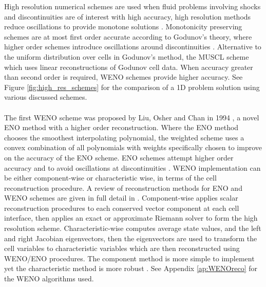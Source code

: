 	High resolution numerical schemes are used when fluid problems involving shocks and discontinuities are of interest with high accuracy, high resolution methods reduce oscillations to provide monotone solutions \cite{Chung02}. Monotonicity preserving schemes are at most first order accurate according to Godunov's theory, where higher order schemes introduce oscillations around discontinuities \cite{Cockburn01}. Alternative to the uniform distribution over cells in Godunov's method, the MUSCL scheme which uses linear reconstructions of Godunov cell data. When accuracy greater than second order is required, WENO schemes provide higher accuracy. See Figure \ref{fig:high_res_schemes} for the comparison of a 1D problem solution using various discussed schemes. 
	\\ \\
	The first WENO scheme was proposed by Liu, Osher and Chan in 1994 \cite{Liu94}, a novel ENO method with a higher order reconstruction. Where the ENO method chooses the smoothest interpolating polynomial, the weighted scheme uses a convex combination of all polynomials with weights specifically chosen to improve on the accuracy of the ENO scheme. ENO schemes attempt higher order accuracy and to avoid oscillations at discontinuities \cite{Chung02}. WENO implementation can be either component-wise or characteristic wise, in terms of the cell reconstruction procedure. A review of reconstruction methods for ENO and WENO schemes are given in full detail in \cite{Shu97}. Component-wise applies scalar reconstruction procedures to each conserved vector component at each cell interface, then applies an exact or approximate Riemann solver to form the high resolution scheme. Characteristic-wise computes average state values, and the left and right Jacobian eigenvectors, then the eigenvectors are used to transform the cell variables to characteristic variables which are then reconstructed using WENO/ENO procedures. The component method is more simple to implement yet the characteristic method is more robust \cite{Shu97}. See Appendix \ref{ap:WENOreco} for the WENO algorithms used.
	\\ \\
